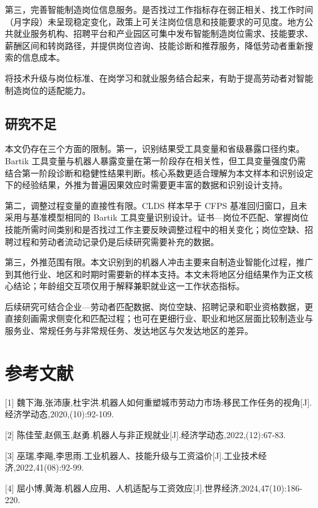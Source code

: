 \documentclass[UTF8, zihao=-4, a4paper, openany, fontset=none]{ctexrep}
\numberwithin{equation}{chapter}
\begin{document}
第三，完善智能制造岗位信息服务。是否找过工作指标存在弱正相关、找工作时间（月字段）未呈现稳定变化，政策上可关注岗位信息和技能要求的可见度。地方公共就业服务机构、招聘平台和产业园区可集中发布智能制造岗位需求、技能要求、薪酬区间和转岗路径，并提供岗位咨询、技能诊断和推荐服务，降低劳动者重新搜索的信息成本。

将技术升级与岗位标准、在岗学习和就业服务结合起来，有助于提高劳动者对智能制造岗位的适配能力。

\section{研究不足}\label{ux7814ux7a76ux4e0dux8db3}

本文仍存在三个方面的限制。第一，识别结果受工具变量和省级暴露口径约束。Bartik 工具变量与机器人暴露变量在第一阶段存在相关性，但工具变量强度仍需结合第一阶段诊断和稳健性结果判断。核心系数更适合理解为本文样本和识别设定下的经验结果，外推为普遍因果效应时需要更丰富的数据和识别设计支持。

第二，调整过程变量的直接性有限。CLDS 样本早于 CFPS 基准回归窗口，且未采用与基准模型相同的 Bartik 工具变量识别设计。证书---岗位不匹配、掌握岗位技能所需时间类别和是否找过工作主要反映调整过程中的相关变化；岗位空缺、招聘过程和劳动者流动记录仍是后续研究需要补充的数据。

第三，外推范围有限。本文识别到的机器人冲击主要来自制造业智能化过程，推广到其他行业、地区和时期时需要新的样本支持。本文未将地区分组结果作为正文核心结论；年龄组交互项仅用于解释兼职就业这一工作状态指标。

后续研究可结合企业---劳动者匹配数据、岗位空缺、招聘记录和职业资格数据，更直接刻画需求侧变化和匹配过程；也可在更细行业、职业和地区层面比较制造业与服务业、常规任务与非常规任务、发达地区与欠发达地区的差异。


\chapter*{参考文献}
{[}1{]} 魏下海,张沛康,杜宇洪.机器人如何重塑城市劳动力市场:移民工作任务的视角{[}J{]}.经济学动态,2020,(10):92-109.

{[}2{]} 陈佳莹,赵佩玉,赵勇.机器人与非正规就业{[}J{]}.经济学动态,2022,(12):67-83.

{[}3{]} 巫瑞,李飚,李思雨.工业机器人、技能升级与工资溢价{[}J{]}.工业技术经济,2022,41(08):92-99.

{[}4{]} 屈小博,黄海.机器人应用、人机适配与工资效应{[}J{]}.世界经济,2024,47(10):186-220.
\end{document}
